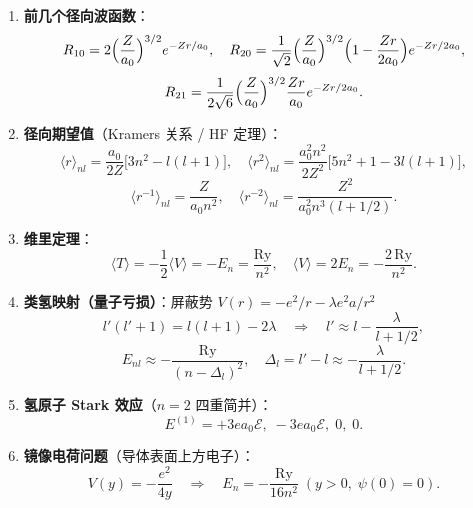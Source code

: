 \begin{formulabox}[核心公式]
\begin{enumerate}[label=\textbf{(\arabic*)}]
    \item \textbf{前几个径向波函数}：
    \[
    R_{10}=2\Bigl(\frac{Z}{a_0}\Bigr)^{3/2}e^{-Zr/a_0},\quad
    R_{20}=\frac{1}{\sqrt{2}}\Bigl(\frac{Z}{a_0}\Bigr)^{3/2}\Bigl(1-\frac{Zr}{2a_0}\Bigr)e^{-Zr/2a_0},
    \]
    \[
    R_{21}=\frac{1}{2\sqrt{6}}\Bigl(\frac{Z}{a_0}\Bigr)^{3/2}\frac{Zr}{a_0}e^{-Zr/2a_0}.
    \]

    \item \textbf{径向期望值}（Kramers 关系 / HF 定理）：
    \[
    \langle r\rangle_{nl}=\frac{a_0}{2Z}\bigl[3n^2-l(l+1)\bigr],\quad
    \langle r^2\rangle_{nl}=\frac{a_0^2n^2}{2Z^2}\bigl[5n^2+1-3l(l+1)\bigr],
    \]
    \[
    \langle r^{-1}\rangle_{nl}=\frac{Z}{a_0n^2},\quad
    \langle r^{-2}\rangle_{nl}=\frac{Z^2}{a_0^2n^3(l+1/2)}.
    \]

    \item \textbf{维里定理}：
    \[
    \langle T\rangle=-\frac12\langle V\rangle=-E_n=\frac{\text{Ry}}{n^2},\quad
    \langle V\rangle=2E_n=-\frac{2\,\text{Ry}}{n^2}.
    \]

    \item \textbf{类氢映射（量子亏损）}：屏蔽势 $V(r)=-e^2/r-\lambda e^2a/r^2$
    \[
    l'(l'+1)=l(l+1)-2\lambda\quad\Rightarrow\quad
    l'\approx l-\frac{\lambda}{l+1/2},
    \]
    \[
    E_{nl}\approx-\frac{\text{Ry}}{(n-\Delta_l)^2},\quad\Delta_l=l'-l\approx-\frac{\lambda}{l+1/2}.
    \]

    \item \textbf{氢原子 Stark 效应}（$n=2$ 四重简并）：
    \[
    E^{(1)}=+3ea_0\mathcal{E},\;-3ea_0\mathcal{E},\;0,\;0.
    \]

    \item \textbf{镜像电荷问题}（导体表面上方电子）：
    \[
    V(y)=-\frac{e^2}{4y}\quad\Rightarrow\quad
    E_n=-\frac{\text{Ry}}{16n^2}\;(y>0,\;\psi(0)=0).
    \]
\end{enumerate}
\end{formulabox}

